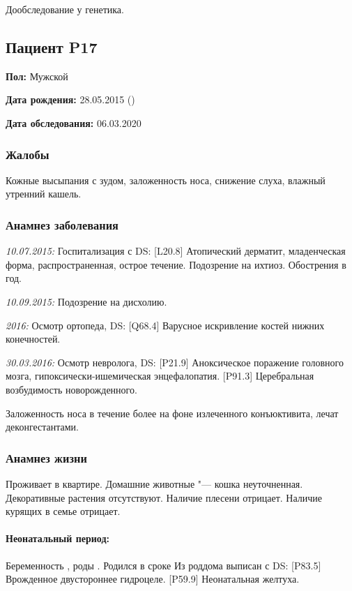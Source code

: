 \documentclass[a4paper,14pt]{extarticle}
\newcommand{\weeks}{нед.}
\newcommand{\pdate}[1]{\emph{#1:} }
\newcommand{\DS}[2]{[#2] #1}
\begin{document}
Дообследование у генетика.

\newpage
\subsection*{Пациент P17}

\textbf{Пол:} Мужской

\textbf{Дата рождения:} 28.05.2015 ()

\textbf{Дата обследования:} 06.03.2020

\subsubsection*{Жалобы}

Кожные высыпания с зудом, заложенность носа, снижение слуха, влажный утренний кашель.

\subsubsection*{Анамнез заболевания}

\pdate{10.07.2015} Госпитализация с DS: \DS{Атопический дерматит, младенческая форма, распространенная, острое течение}{L20.8}. Подозрение на ихтиоз. Обострения  в год.

\pdate{10.09.2015} Подозрение на дисхолию.

\pdate{2016} Осмотр ортопеда, DS: \DS{Варусное искривление костей нижних конечностей}{Q68.4}.

\pdate{30.03.2016} Осмотр невролога, DS: \DS{Аноксическое поражение головного мозга, гипоксически-ишемическая энцефалопатия}{P21.9}. \DS{Церебральная возбудимость новорожденного}{P91.3}.

Заложенность носа в течение более  на фоне излеченного конъюктивита, лечат деконгестантами.

\subsubsection*{Анамнез жизни}

Проживает в квартире. Домашние животные "--- кошка неуточненная. Декоративные растения отсутствуют. Наличие плесени отрицает. Наличие курящих в семье отрицает.

\paragraph{Неонатальный период:} Беременность , роды . Родился в сроке \numprint[\weeks]{41} Из роддома выписан с DS: \DS{Врожденное двустороннее гидроцеле}{P83.5}. \DS{Неонатальная желтуха}{P59.9}.
\end{document}
